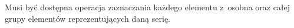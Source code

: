 \documentclass[11pt,twoside,a4paper,final]{article}
\begin{document}
Musi być dostępna operacja zaznaczania każdego elementu z~osobna oraz całej grupy elementów reprezentujących daną serię.





\end{document}
